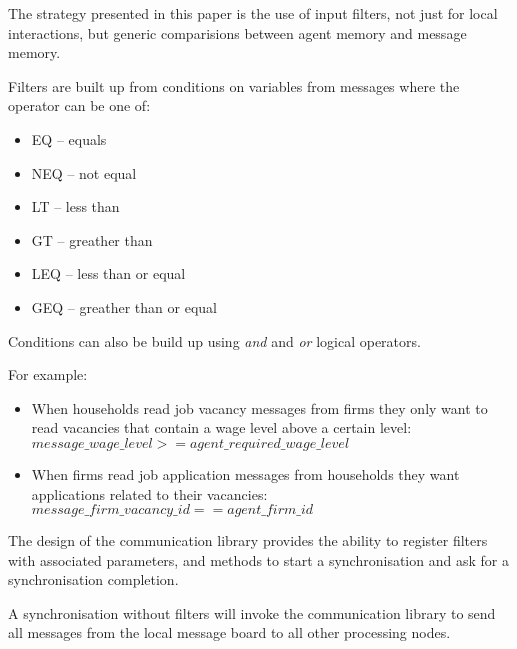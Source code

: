 \documentclass{aamas2009}
\begin{document}
% 
% 
% 

The strategy presented in this paper is the use of input filters, not just for
local interactions, but generic comparisions between agent memory
and message memory.

Filters are built up from conditions on variables from messages where the
operator can be one of:

\begin{itemize}
  \item EQ -- equals
  \item NEQ -- not equal
  \item LT -- less than
  \item GT -- greather than
  \item LEQ -- less than or equal
  \item GEQ -- greather than or equal
\end{itemize}

Conditions can also be build up using \textit{and} and \textit{or} logical
operators.

For example:

\begin{itemize}
  \item When households read job vacancy messages from firms they only want to
  read vacancies that contain a wage level above a certain level:\\
$message\_wage\_level >= agent\_required\_wage\_level$
  \item When firms read job application messages from
households they want applications related to their vacancies:\\
$message\_firm\_vacancy\_id == agent\_firm\_id$
\end{itemize}

The design of the communication library provides the ability to register
filters with associated parameters, and methods to start a synchronisation and
ask for a synchronisation completion.

A synchronisation without filters will invoke the communication library to send
all messages from the local message board to all other processing nodes.
\end{document}
